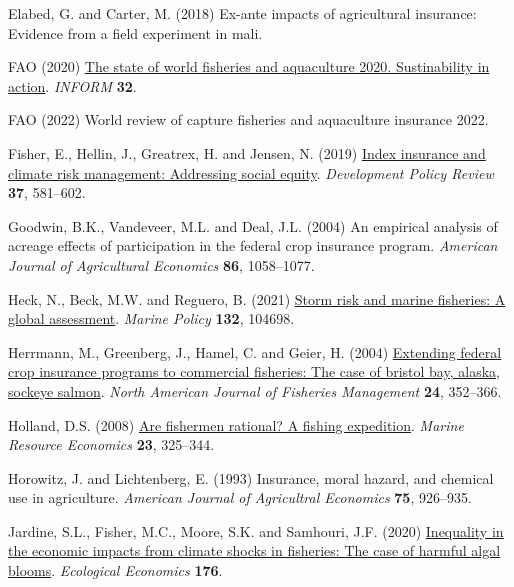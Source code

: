 \documentclass[
  letterpaper,
  DIV=11,
  numbers=noendperiod]{scrartcl}
\newlength{\cslhangindent}
\newlength{\cslentryspacingunit} %
\newenvironment{CSLReferences}[2] %
 {%
  \setlength{\parindent}{0pt}
  \ifodd #1
  \let\oldpar\par
  \def\par{\hangindent=\cslhangindent\oldpar}
  \fi
  \setlength{\parskip}{#2\cslentryspacingunit}
 }%
 {}
\theoremstyle{plain}
\theoremstyle{plain}
\theoremstyle{remark}
\begin{document}
\begin{CSLReferences}{1}{0}
\leavevmode{}%
Elabed, G. and Carter, M. (2018) Ex-ante impacts of agricultural
insurance: Evidence from a field experiment in mali.

\leavevmode{}%
FAO (2020) \href{https://doi.org/10.4060/ca9229en}{The state of world
fisheries and aquaculture 2020. Sustinability in action}. \emph{INFORM}
\textbf{32}.

\leavevmode{}%
FAO (2022) World review of capture fisheries and aquaculture insurance
2022.

\leavevmode{}%
Fisher, E., Hellin, J., Greatrex, H. and Jensen, N. (2019)
\href{https://doi.org/10.1111/dpr.12387}{Index insurance and climate
risk management: Addressing social equity}. \emph{Development Policy
Review} \textbf{37}, 581--602.

\leavevmode{}%
Goodwin, B.K., Vandeveer, M.L. and Deal, J.L. (2004) An empirical
analysis of acreage effects of participation in the federal crop
insurance program. \emph{American Journal of Agricultural Economics}
\textbf{86}, 1058--1077.

\leavevmode{}%
Heck, N., Beck, M.W. and Reguero, B. (2021)
\href{https://doi.org/10.1016/j.marpol.2021.104698}{Storm risk and
marine fisheries: A global assessment}. \emph{Marine Policy}
\textbf{132}, 104698.

\leavevmode{}%
Herrmann, M., Greenberg, J., Hamel, C. and Geier, H. (2004)
\href{https://doi.org/10.1577/M02-086.1}{Extending federal crop
insurance programs to commercial fisheries: The case of bristol bay,
alaska, sockeye salmon}. \emph{North American Journal of Fisheries
Management} \textbf{24}, 352--366.

\leavevmode{}%
Holland, D.S. (2008)
\href{https://doi.org/10.1086/mre.23.3.42629621}{Are fishermen rational?
A fishing expedition}. \emph{Marine Resource Economics} \textbf{23},
325--344.

\leavevmode{}%
Horowitz, J. and Lichtenberg, E. (1993) Insurance, moral hazard, and
chemical use in agriculture. \emph{American Journal of Agricultral
Economics} \textbf{75}, 926--935.

\leavevmode{}%
Jardine, S.L., Fisher, M.C., Moore, S.K. and Samhouri, J.F. (2020)
\href{https://doi.org/10.1016/j.ecolecon.2020.106691}{Inequality in the
economic impacts from climate shocks in fisheries: The case of harmful
algal blooms}. \emph{Ecological Economics} \textbf{176}.


\end{CSLReferences}
\end{document}
